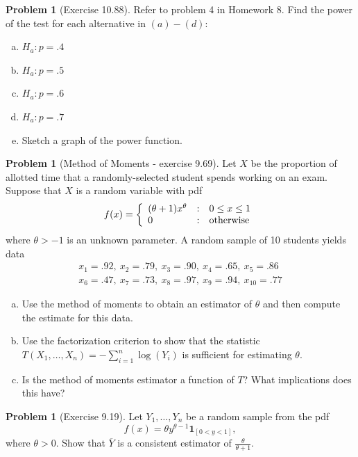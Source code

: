 \documentclass[10pt]{article}
\theoremstyle{definition}
\newtheorem{problem}[theorem]{Problem}
\newcommand{\1}[1]{\textbf{1}_{\left[#1\right]}} %
\begin{document}
\begin{problem}[Exercise 10.88]
  Refer to problem 4 in Homework 8. Find the power of the test for each
  alternative in $(a)-(d)$:
  \begin{enumerate}[(a)]
    \item $H_{a}:p=.4 $
    \item $H_{a}:p=.5 $
    \item $H_{a}:p=.6 $
    \item $H_{a}:p=.7 $
    \item Sketch a graph of the power function.
  \end{enumerate}
\end{problem}


\begin{problem}[Method of Moments - exercise 9.69]
  Let $X$ be the proportion of allotted time that a randomly-selected student
  spends working on an exam. Suppose that $X$ is a random variable with pdf
  \begin{equation*}
    f(x) = \left\{ \begin{array}{l@{\quad:\quad}l} (\theta+1)x^{\theta}
        &0 \leq x \leq 1 \\ 0& \text{otherwise} \end{array}\right.
  \end{equation*}
  where $\theta>-1$ is an unknown parameter. A random sample of 10 students
  yields data
  \begin{gather*}
    x_{1} = .92,\ x_{2} = .79,\ x_{3} = .90,\ x_{4}=.65,\ x_{5}=.86\ \\
    x_{6}=.47,\ x_{7}=.73,\ x_{8}=.97,\ x_{9}=.94,\ x_{10}=.77
  \end{gather*}
  \begin{enumerate}[(a)]
    \item Use the method of moments to obtain an estimator of $\theta$ and
    then compute the estimate for this data.
    \item Use the factorization criterion to show that the statistic
    $T(X_{1},\ldots,X_{n})= - \sum_{i=1}^{n} \log(Y_{i})$ is sufficient for
    estimating $\theta$. 
    \item Is the method of moments estimator a function of $T$? What
    implications does this have?
  \end{enumerate}
\end{problem}


\begin{problem}[Exercise 9.19]
  Let $Y_{1},\ldots,Y_{n}$ be a random sample from the pdf
  \begin{equation*}
    f(x) = \theta y^{\theta-1}\mathbf{1}_{\left[ 0<y<1 \right]},
  \end{equation*}
  where $\theta>0$. Show that $\overline{Y}$ is a consistent estimator of
  $\frac{\theta}{\theta+1}$.
\end{problem}
\end{document}
